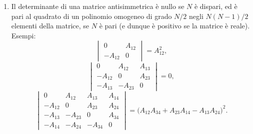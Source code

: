 \documentclass[11pt, a4paper]{book}
\numberwithin{equation}{section}
\begin{document}
\begin{enumerate}
Il modulo di un determinante è minore o uguale al prodotto dei moduli dei vettori che ne costituiscono le colonne (o le righe):
\begin{align}
    |\det[A]| &\leq \prod_{k=1}^{N} \left\{ \sum_{j=1}^{N} |A_{jk}|^2 \right\}^{\frac{1}{2}},
    \tag{60a} \\
    |\det[A]| &\leq \prod_{j=1}^{N} \left\{ \sum_{k=1}^{N} |A_{jk}|^2 \right\}^{\frac{1}{2}}.
    \tag{60b}
\end{align}
Il segno di uguaglianza si ha solo se i vettori che costituiscono le colonne (o le righe) della matrice $A$ sono tutti fra loro ortogonali, cioè se
\begin{equation}
    A_{jk}^*\, A_{j\ell} = 0 \quad \text{per } k \neq \ell,\;
    (k = 1,2,\ldots,N;\; \ell = 1,2,\ldots,N),
    \tag{61a}
\end{equation}
ovvero
\begin{equation}
    A_{jk}^*\, A_{\ell k} = 0 \quad \text{per } j \neq \ell,\;
    (j = 1,2,\ldots,N;\; \ell = 1,2,\ldots,N).
    \tag{61b}
\end{equation}
In particolare, se $M$ è il più grande in modulo degli elementi della matrice $A$,
\begin{equation}
    |A_{jk}| \leq M, \quad (j = 1,2,\ldots,N;\; k = 1,2,\ldots,N),
    \tag{62}
\end{equation}
vale la disuguaglianza
\begin{equation}
    |\det[A]| \leq N^{\frac{N}{2}}\, M^N.
    \tag{63}
\end{equation}

\item Il determinante di una matrice antisimmetrica è nullo se $N$ è dispari, ed è pari al quadrato di un polinomio omogeneo di grado $N/2$ negli $N(N-1)/2$ elementi della matrice, se $N$ è pari (e dunque è positivo se la matrice è reale). Esempi:
\begin{equation}
    \begin{vmatrix} 0 & A_{12} \\ -A_{12} & 0 \end{vmatrix}
    = A_{12}^2,
    \tag{64a}
\end{equation}
\begin{equation}
    \begin{vmatrix} 0 & A_{12} & A_{13} \\ -A_{12} & 0 & A_{23} \\ -A_{13} & -A_{23} & 0 \end{vmatrix}
    = 0,
    \tag{64b}
\end{equation}
\begin{equation}
    \begin{vmatrix}
        0 & A_{12} & A_{13} & A_{14} \\
        -A_{12} & 0 & A_{23} & A_{24} \\
        -A_{13} & -A_{23} & 0 & A_{34} \\
        -A_{14} & -A_{24} & -A_{34} & 0
    \end{vmatrix}
    = \bigl(A_{12} A_{34} + A_{23} A_{14} - A_{13} A_{24}\bigr)^2.
    \tag{64c}
\end{equation}

\end{enumerate}
\end{document}
